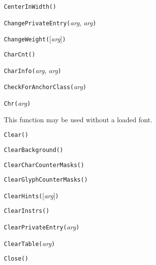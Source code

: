 
\noindent\texttt{CenterInWidth(}\texttt{)}


\noindent\texttt{ChangePrivateEntry(}\textit{arg}, \textit{arg}\texttt{)}


\noindent\texttt{ChangeWeight(}[\textit{arg}]\texttt{)}


\noindent\texttt{CharCnt(}\texttt{)}


\noindent\texttt{CharInfo(}\textit{arg}, \textit{arg}\texttt{)}


\noindent\texttt{CheckForAnchorClass(}\textit{arg}\texttt{)}


\noindent\texttt{Chr(}\textit{arg}\texttt{)}

This function may be used without a loaded font.


\noindent\texttt{Clear(}\texttt{)}


\noindent\texttt{ClearBackground(}\texttt{)}


\noindent\texttt{ClearCharCounterMasks(}\texttt{)}


\noindent\texttt{ClearGlyphCounterMasks(}\texttt{)}


\noindent\texttt{ClearHints(}[\textit{arg}]\texttt{)}


\noindent\texttt{ClearInstrs(}\texttt{)}


\noindent\texttt{ClearPrivateEntry(}\textit{arg}\texttt{)}


\noindent\texttt{ClearTable(}\textit{arg}\texttt{)}


\noindent\texttt{Close(}\texttt{)}

